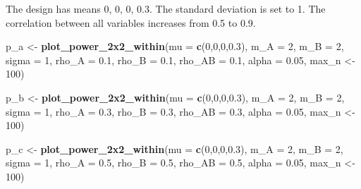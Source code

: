 \documentclass[]{article}
\newenvironment{Shaded}{\begin{snugshade}}{\end{snugshade}}
\newcommand{\KeywordTok}[1]{\textcolor[rgb]{0.13,0.29,0.53}{\textbf{#1}}}
\newcommand{\DataTypeTok}[1]{\textcolor[rgb]{0.13,0.29,0.53}{#1}}
\newcommand{\DecValTok}[1]{\textcolor[rgb]{0.00,0.00,0.81}{#1}}
\newcommand{\FloatTok}[1]{\textcolor[rgb]{0.00,0.00,0.81}{#1}}
\newcommand{\StringTok}[1]{\textcolor[rgb]{0.31,0.60,0.02}{#1}}
\newcommand{\NormalTok}[1]{#1}
\begin{document}
The design has means 0, 0, 0, 0.3. The standard deviation is set to 1.
The correlation between all variables increases from 0.5 to 0.9.

\begin{Shaded}
\begin{Highlighting}[]
\NormalTok{p_a <-}\StringTok{ }\KeywordTok{plot_power_2x2_within}\NormalTok{(}\DataTypeTok{mu =} \KeywordTok{c}\NormalTok{(}\DecValTok{0}\NormalTok{,}\DecValTok{0}\NormalTok{,}\DecValTok{0}\NormalTok{,}\FloatTok{0.3}\NormalTok{), }
                      \DataTypeTok{m_A =} \DecValTok{2}\NormalTok{, }
                      \DataTypeTok{m_B =} \DecValTok{2}\NormalTok{, }
                      \DataTypeTok{sigma =} \DecValTok{1}\NormalTok{, }
                      \DataTypeTok{rho_A =} \FloatTok{0.1}\NormalTok{, }
                      \DataTypeTok{rho_B =} \FloatTok{0.1}\NormalTok{, }
                      \DataTypeTok{rho_AB =} \FloatTok{0.1}\NormalTok{, }
                      \DataTypeTok{alpha =} \FloatTok{0.05}\NormalTok{,}
\NormalTok{                      max_n <-}\StringTok{ }\DecValTok{100}\NormalTok{)}

\NormalTok{p_b <-}\StringTok{ }\KeywordTok{plot_power_2x2_within}\NormalTok{(}\DataTypeTok{mu =} \KeywordTok{c}\NormalTok{(}\DecValTok{0}\NormalTok{,}\DecValTok{0}\NormalTok{,}\DecValTok{0}\NormalTok{,}\FloatTok{0.3}\NormalTok{), }
                      \DataTypeTok{m_A =} \DecValTok{2}\NormalTok{, }
                      \DataTypeTok{m_B =} \DecValTok{2}\NormalTok{, }
                      \DataTypeTok{sigma =} \DecValTok{1}\NormalTok{, }
                      \DataTypeTok{rho_A =} \FloatTok{0.3}\NormalTok{, }
                      \DataTypeTok{rho_B =} \FloatTok{0.3}\NormalTok{, }
                      \DataTypeTok{rho_AB =} \FloatTok{0.3}\NormalTok{, }
                      \DataTypeTok{alpha =} \FloatTok{0.05}\NormalTok{,}
\NormalTok{                      max_n <-}\StringTok{ }\DecValTok{100}\NormalTok{)}

\NormalTok{p_c <-}\StringTok{ }\KeywordTok{plot_power_2x2_within}\NormalTok{(}\DataTypeTok{mu =} \KeywordTok{c}\NormalTok{(}\DecValTok{0}\NormalTok{,}\DecValTok{0}\NormalTok{,}\DecValTok{0}\NormalTok{,}\FloatTok{0.3}\NormalTok{), }
                      \DataTypeTok{m_A =} \DecValTok{2}\NormalTok{, }
                      \DataTypeTok{m_B =} \DecValTok{2}\NormalTok{, }
                      \DataTypeTok{sigma =} \DecValTok{1}\NormalTok{, }
                      \DataTypeTok{rho_A =} \FloatTok{0.5}\NormalTok{, }
                      \DataTypeTok{rho_B =} \FloatTok{0.5}\NormalTok{, }
                      \DataTypeTok{rho_AB =} \FloatTok{0.5}\NormalTok{, }
                      \DataTypeTok{alpha =} \FloatTok{0.05}\NormalTok{,}
\NormalTok{                      max_n <-}\StringTok{ }\DecValTok{100}\NormalTok{)}


\end{Highlighting}
\end{Shaded}
\end{document}
